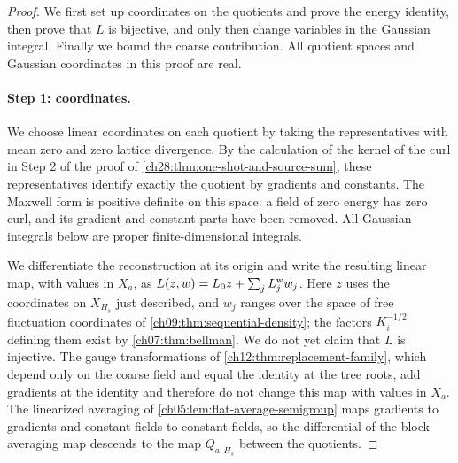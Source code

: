 \begin{proof}
We first set up coordinates on the quotients and prove the energy identity, then prove that $L$ is bijective, and only then change variables in the Gaussian integral. Finally we bound the coarse contribution. All quotient spaces and Gaussian coordinates in this proof are real.

\paragraph{Step 1: coordinates.}
We choose linear coordinates on each quotient by taking the representatives with mean zero and zero lattice divergence. By the calculation of the kernel of the curl in Step 2 of the proof of \cref{ch28:thm:one-shot-and-source-sum}, these representatives identify exactly the quotient by gradients and constants. The Maxwell form is positive definite on this space: a field of zero energy has zero curl, and its gradient and constant parts have been removed. All Gaussian integrals below are proper finite-dimensional integrals.

We differentiate the reconstruction at its origin and write the resulting linear map, with values in $X_a$, as $L(z,w)=L_0z+\sum_jL_j^{\rm w}w_j$. Here $z$ uses the coordinates on $X_{H_s}$ just described, and $w_j$ ranges over the space of free fluctuation coordinates of \cref{ch09:thm:sequential-density}; the factors $K_i^{-1/2}$ defining them exist by \cref{ch07:thm:bellman}. We do not yet claim that $L$ is injective. The gauge transformations of \cref{ch12:thm:replacement-family}, which depend only on the coarse field and equal the identity at the tree roots, add gradients at the identity and therefore do not change this map with values in $X_a$. The linearized averaging of \cref{ch05:lem:flat-average-semigroup} maps gradients to gradients and constant fields to constant fields, so the differential of the block averaging map descends to the map $Q_{a,H_s}$ between the quotients.


\end{proof}
